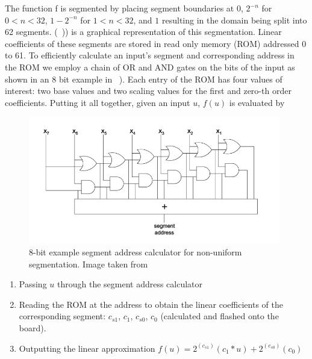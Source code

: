 The function f is segmented by placing segment boundaries at $0$, $2^{-n}$ for  $0 < n < 32$, $1-2^{-n}$ for $1<n<32$, and $1$ resulting in the domain being split into 62 segments. (\Figure~)) is a graphical representation of this segmentation. Linear coefficients of these segments are stored in read only memory (ROM) addressed 0 to 61. To efficiently calculate an input’s segment and corresponding address in the ROM we employ a chain of OR and AND gates on the bits of the input as shown in an 8 bit example in \Figure~). Each entry of the ROM has four values of interest: two base values and two scaling values for the first and zero-th order coefficients. Putting it all together, given an input $u$, $f(u)$ is evaluated by 

\begin{figure}
\centering\CaptionFontSize
\includegraphics[height=15em]
{Figures/address_calculator.png}
\caption[8-bit example segment address calculator for non-uniform segmentation]
{8-bit example segment address calculator for non-uniform segmentation. Image taken from \cite{noise_gen}}
\label{Figure:NoiseGeneration:AddressCalculator}
\end{figure}

\begin{enumerate}
    \item Passing $u$ through the segment address calculator
    \item Reading the ROM at the address to obtain the linear coefficients of the corresponding segment: $c_{s1}$, $c_1$, $c_{s0}$, $c_0$ (calculated and flashed onto the board).
    \item Outputting the linear approximation $f(u) = 2^{(c_{s1})} (c_1 * u) + 2^{(c_{s0})} (c_0 )$
\end{enumerate}

